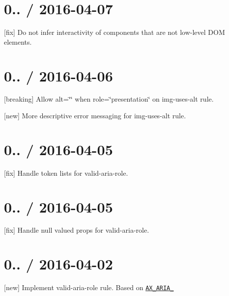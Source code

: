 \section*{0.. / 2016-\/04-\/07 }


\begin{DoxyItemize}
\item \mbox{[}fix\mbox{]} Do not infer interactivity of components that are not low-\/level D\+OM elements.
\end{DoxyItemize}

\section*{0.. / 2016-\/04-\/06 }


\begin{DoxyItemize}
\item \mbox{[}breaking\mbox{]} Allow alt=\char`\"{}\char`\"{} when role=\char`\"{}presentation\char`\"{} on img-\/uses-\/alt rule.
\item \mbox{[}new\mbox{]} More descriptive error messaging for img-\/uses-\/alt rule.
\end{DoxyItemize}

\section*{0.. / 2016-\/04-\/05 }


\begin{DoxyItemize}
\item \mbox{[}fix\mbox{]} Handle token lists for valid-\/aria-\/role.
\end{DoxyItemize}

\section*{0.. / 2016-\/04-\/05 }


\begin{DoxyItemize}
\item \mbox{[}fix\mbox{]} Handle null valued props for valid-\/aria-\/role.
\end{DoxyItemize}

\section*{0.. / 2016-\/04-\/02 }


\begin{DoxyItemize}
\item \mbox{[}new\mbox{]} Implement valid-\/aria-\/role rule. Based on \href{https://github.com/GoogleChrome/accessibility-developer-tools/wiki/Audit-Rules#ax_aria_01}{\tt A\+X\+\_\+\+A\+R\+I\+A\+\_}
\end{DoxyItemize}

